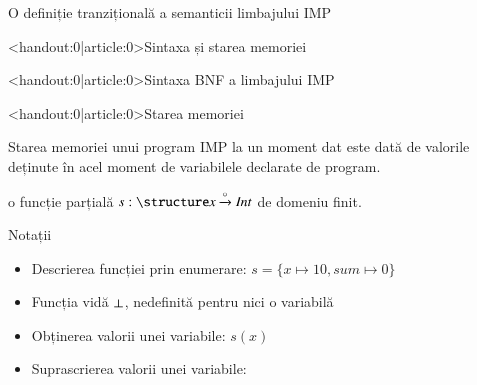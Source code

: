 \documentclass[handout,xcolor=pdftex,romanian,colorlinks]{beamer}
\begin{document}
\begin{section}{O definiție tranzițională a semanticii limbajului IMP}
\begin{subsection}<handout:0|article:0>{Sintaxa și starea memoriei}
\begin{frame}<handout:0|article:0>{Sintaxa BNF a limbajului IMP}
\vspace{-5ex}
\end{frame}

\begin{frame}<handout:0|article:0>{Starea memoriei}
\begin{block}{}
Starea memoriei unui program IMP la un moment dat este dată de valorile deținute în acel moment de variabilele declarate de program.

 o funcție \alert{parțială} $s : \Id \xrightarrow{\circ}\SInt$ de domeniu finit.
\end{block}
\begin{block}{Notații}
\begin{itemize}
\item Descrierea funcției prin enumerare:
$s = \{ x \mapsto 10, sum \mapsto 0\}$
\item Funcția vidă $\perp$, nedefinită pentru nici o variabilă
\item Obținerea valorii unei variabile: $s(x)$
\item Suprascrierea valorii unei variabile:


\end{itemize}
\end{block}
\end{frame}
\end{subsection}
\end{section}
\end{document}
